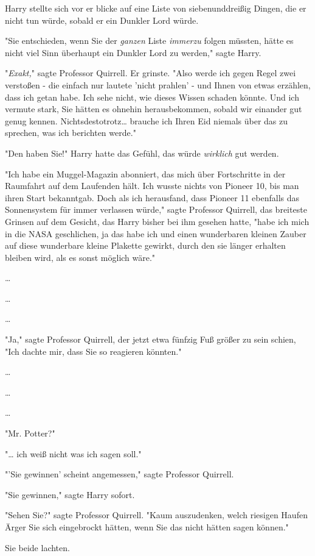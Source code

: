 {Harry stellte sich vor er blicke auf eine Liste von siebenunddreißig Dingen, die er nicht tun würde, sobald er ein Dunkler Lord würde.

"Sie entschieden, wenn Sie der \emph{ganzen} Liste \emph{immerzu} folgen müssten, hätte es nicht viel Sinn überhaupt ein Dunkler Lord zu werden," sagte Harry.

"\emph{Exakt,}" sagte Professor Quirrell. Er grinste. "Also werde ich gegen Regel zwei verstoßen - die einfach nur lautete 'nicht prahlen' - und Ihnen von etwas erzählen, dass ich getan habe. Ich sehe nicht, wie dieses Wissen schaden könnte. Und ich vermute stark, Sie hätten es ohnehin herausbekommen, sobald wir einander gut genug kennen. Nichtsdestotrotz… brauche ich Ihren Eid niemals über das zu sprechen, was ich berichten werde."

"Den haben Sie!" Harry hatte das Gefühl, das würde \emph{wirklich} gut werden.

"Ich habe ein Muggel-Magazin abonniert, das mich über Fortschritte in der Raumfahrt auf dem Laufenden hält. Ich wusste nichts von Pioneer 10, bis man ihren Start bekanntgab. Doch als ich herausfand, dass Pioneer 11 ebenfalls das Sonnensystem für immer verlassen würde," sagte Professor Quirrell, das breiteste Grinsen auf dem Gesicht, das Harry bisher bei ihm gesehen hatte, "habe ich mich in die NASA geschlichen, ja das habe ich und einen wunderbaren kleinen Zauber auf diese wunderbare kleine Plakette gewirkt, durch den sie länger erhalten bleiben wird, als es sonst möglich wäre."

…

…

…

"Ja," sagte Professor Quirrell, der jetzt etwa fünfzig Fuß größer zu sein schien, "Ich dachte mir, dass Sie so reagieren könnten."

…

…

…

"Mr. Potter?"

"… ich weiß nicht was ich sagen soll."

"'Sie gewinnen' scheint angemessen," sagte Professor Quirrell.

"Sie gewinnen," sagte Harry sofort.

"Sehen Sie?" sagte Professor Quirrell. "Kaum auszudenken, welch riesigen Haufen Ärger Sie sich eingebrockt hätten, wenn Sie das nicht hätten sagen können."

Sie beide lachten.

}
